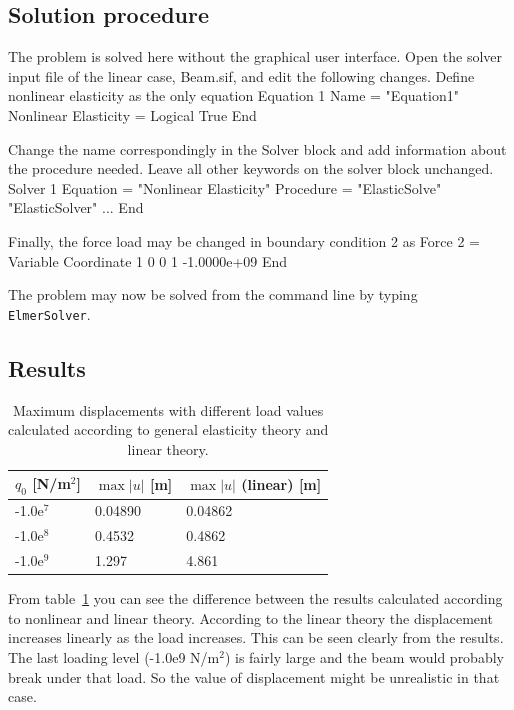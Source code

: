 \subsection*{Solution procedure}

The problem is solved here without the graphical user interface.
Open the solver input file of the linear case, Beam.sif, and edit the
following changes. Define nonlinear elasticity as the only equation
\ttbegin
Equation 1
  Name = "Equation1"
  Nonlinear Elasticity = Logical True
End
\ttend

Change the name correspondingly in the Solver block and add
information about the procedure needed. Leave all other keywords on
the solver block unchanged.
\ttbegin
Solver 1
  Equation = "Nonlinear Elasticity"
  Procedure = "ElasticSolve" "ElasticSolver"
...
End
\ttend

Finally, the force load may be changed in boundary condition 2 as
\ttbegin
  Force 2 = Variable Coordinate 1
      0 0
      1 -1.0000e+09
    End
\ttend

The problem may now be solved from the command line by typing {\tt
ElmerSolver}.

\subsection*{Results}

\begin{table}[tbhp]
\caption{Maximum displacements with different load values calculated according to 
general elasticity theory and linear theory.}
\label{tb:struct3b}
\begin{center}
\begin{tabular}{lll} \hline
$q_0$ [N/m$^2$] & 
$\max |u|$ [m] &
$\max |u|$ (linear) [m] \\ \hline
-1.0e$^7$ & 0.04890 & 0.04862 \\
-1.0e$^8$ & 0.4532 & 0.4862  \\
-1.0e$^9$ & 1.297  & 4.861 \\ \hline
\end{tabular}
\end{center}
\end{table}

From table~\ref{tb:struct3b} you can see the difference between the 
results calculated according to nonlinear and linear theory. According to 
the linear theory the displacement increases linearly as the load 
increases. This can be seen clearly from the results. The last loading
level (-1.0e9 N/m$^2$) is fairly large and the beam would probably break 
under that load. So the value of displacement might be unrealistic in that
case.   


\vfill
\mbox{}
